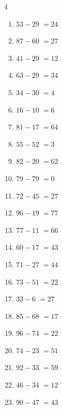 \begin{multicols}{4}
\begin{enumerate}
  \item $53-29$
        $=24$

  \item $87-60$
        $=27$

  \item $41-29$
        $=12$

  \item $63-29$
        $=34$

  \item $34-30$
        $=4$

\columnbreak %

  \item $16-10$
        $=6$

  \item $81-17$
        $=64$

  \item $55-52$
        $=3$

  \item $82-20$
        $=62$

  \item $79-79$
        $=0$

  \item $72-45$
        $=27$

  \item $96-19$
        $=77$

  \item $77-11$
        $=66$

  \item $60-17$
        $=43$

  \item $71-27$
        $=44$

  \item $73-51$
        $=22$

  \item $33-6$
        $=27$

  \item $85-68$
        $=17$

  \item $96-74$
        $=22$

  \item $74-23$
        $=51$

  \item $92-33$
        $=59$

  \item $46-34$
        $=12$

  \item $90-47$
        $=43$


\end{enumerate}
\end{multicols}
